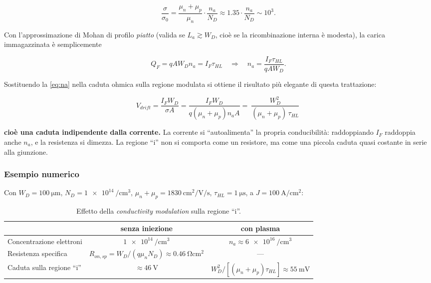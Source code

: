 \documentclass[11pt,a4paper]{article}
\begin{document}
\begin{equation}
\frac{\sigma}{\sigma_0} = \frac{\mu_n + \mu_p}{\mu_n}\cdot\frac{n_a}{N_D}
\approx 1.35 \cdot \frac{n_a}{N_D} \sim 10^{3} .
\end{equation}

Con l'approssimazione di Mohan di profilo \emph{piatto} (valida se
$L_a \gtrsim W_D$, cioè se la ricombinazione interna è modesta), la carica
immagazzinata è semplicemente

\begin{equation}
Q_F = q A W_D n_a = I_F \tau_{HL}
\quad\Longrightarrow\quad
n_a = \frac{I_F \tau_{HL}}{q A W_D} .
\label{eq:na}
\end{equation}

Sostituendo la \eqref{eq:na} nella caduta ohmica sulla regione modulata si
ottiene il risultato più elegante di questa trattazione:

\begin{equation}
V_{drift} = \frac{I_F W_D}{\sigma A}
= \frac{I_F W_D}{q(\mu_n+\mu_p) n_a A}
= \boxed{\ \frac{W_D^{2}}{(\mu_n + \mu_p)\, \tau_{HL}}\ }
\label{eq:vdrift}
\end{equation}

\noindent
\textbf{cioè una caduta indipendente dalla corrente.} La corrente si
``autoalimenta'' la propria conducibilità: raddoppiando $I_F$ raddoppia anche
$n_a$, e la resistenza si dimezza. La regione ``i'' non si comporta come un
resistore, ma come una piccola caduta quasi costante in serie alla giunzione.

\subsubsection*{Esempio numerico}

Con $W_D = \SI{100}{\micro\meter}$, $N_D = \SI{1e14}{\per\centi\meter\cubed}$,
$\mu_n + \mu_p = \SI{1830}{\centi\meter\squared\per\volt\per\second}$,
$\tau_{HL} = \SI{1}{\micro\second}$, a
$J = \SI{100}{\ampere\per\centi\meter\squared}$:

\begin{table}[htbp]
\centering
\caption{Effetto della \emph{conductivity modulation} sulla regione ``i''.}
\begin{tabular}{lcc}
\toprule
 & senza iniezione & con plasma \\
\midrule
Concentrazione elettroni & $\SI{1e14}{\per\centi\meter\cubed}$ & $n_a \approx \SI{6e16}{\per\centi\meter\cubed}$ \\
Resistenza specifica & $R_{on,sp} = W_D/(q\mu_n N_D) \approx \SI{0.46}{\ohm\centi\meter\squared}$ & --- \\
Caduta sulla regione ``i'' & $\approx \SI{46}{\volt}$ & $W_D^2/[(\mu_n+\mu_p)\tau_{HL}] \approx \SI{55}{\milli\volt}$ \\
\bottomrule
\end{tabular}
\end{table}
\end{document}
